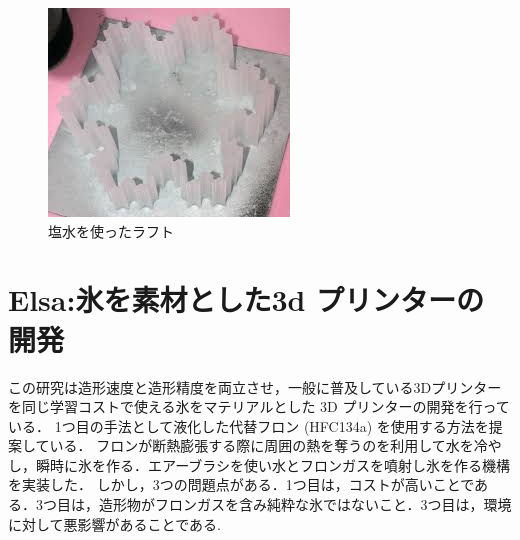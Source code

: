 \begin{figure}[H]
  \centering
  \includegraphics[width=9truecm]{./fig/Robo.png}
  \caption{塩水を使ったラフト}
  \label{fig:ferret}
\end{figure}


\section{Elsa:氷を素材とした3d プリンターの開発\cite{h}}
\label{sec:enum}
この研究は造形速度と造形精度を両立させ，一般に普及している3Dプリンターを同じ学習コストで使える氷をマテリアルとした 3D プリンターの開発を行っている．
1つ目の手法として液化した代替フロン (HFC134a) を使用する方法を提案している．
フロンが断熱膨張する際に周囲の熱を奪うのを利用して水を冷やし，瞬時に氷を作る．エアーブラシを使い水とフロンガスを噴射し氷を作る機構を実装した．
しかし，3つの問題点がある．1つ目は，コストが高いことである．3つ目は，造形物がフロンガスを含み純粋な氷ではないこと．3つ目は，環境に対して悪影響があることである.

